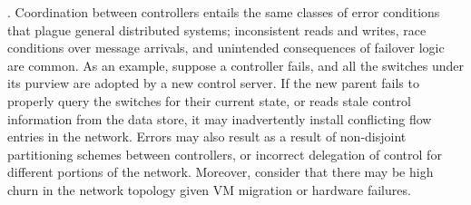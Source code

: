 . Coordination between controllers
entails the same classes of error
conditions that plague general distributed systems; inconsistent reads and
writes, race conditions over message arrivals, and unintended consequences of failover
logic are common. As an example, suppose a controller fails, and all the
switches under its purview are adopted by a new control server. If the new parent
fails to properly query the switches for their current state, or reads
stale control information from the data store, it may inadvertently install
conflicting flow entries in the network. Errors may also result as a
result of non-disjoint partitioning
schemes between controllers, or incorrect delegation of control for different
portions of the network. 
Moreover, consider that there may
be high churn in the network topology given VM migration or 
hardware failures. 

